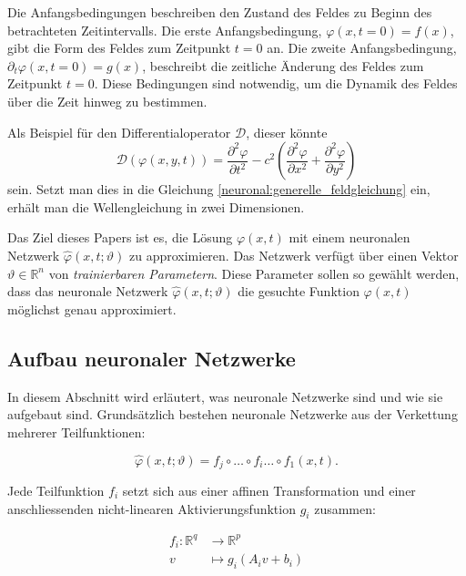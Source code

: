 Die Anfangsbedingungen beschreiben den Zustand des Feldes zu Beginn des betrachteten Zeitintervalls.
Die erste Anfangsbedingung, $\varphi(x, t = 0) = f(x)$, gibt die Form des Feldes zum Zeitpunkt $t = 0$ an.
Die zweite Anfangsbedingung, $\partial_t \varphi(x, t = 0) = g(x)$, beschreibt die zeitliche Änderung des Feldes zum Zeitpunkt $t = 0$.
Diese Bedingungen sind notwendig, um die Dynamik des Feldes über die Zeit hinweg zu bestimmen.

Als Beispiel für den Differentialoperator $\mathcal{D}$, dieser könnte
\begin{equation}
    \mathcal{D}(\varphi(x, y, t)) = \frac{\partial^2 \varphi}{\partial t^2} - c^2 \left( \frac{\partial^2 \varphi}{\partial x^2} + \frac{\partial^2 \varphi}{\partial y^2} \right)
    \label{neuronal:bsp_differentialoperator}
\end{equation}
sein.
Setzt man dies in die Gleichung \eqref{neuronal:generelle_feldgleichung} ein, erhält man die Wellengleichung in zwei Dimensionen.

Das Ziel dieses Papers ist es, die Lösung $\varphi(x, t)$ mit einem neuronalen Netzwerk $\hat{\varphi}(x, t; \vartheta)$ zu approximieren.
Das Netzwerk verfügt über einen Vektor \( \vartheta \in \mathbb{R}^n \) von \emph{trainierbaren Parametern}.
Diese Parameter sollen so gewählt werden, dass das neuronale Netzwerk $\hat{\varphi}(x, t; \vartheta)$ die gesuchte Funktion $\varphi(x, t)$ möglichst genau approximiert.

\subsection{Aufbau neuronaler Netzwerke}\label{neuronal:subsection:struktur_nn}
In diesem Abschnitt wird erläutert, was neuronale Netzwerke sind und wie sie aufgebaut sind.
Grundsätzlich bestehen neuronale Netzwerke aus der Verkettung mehrerer Teilfunktionen:

\begin{equation}
    \hat{\varphi}(x, t; \vartheta) = f_j \circ \ldots \circ f_i \ldots \circ f_1(x, t).
    \label{neuronal:nn_ausformuliert}
\end{equation}

Jede Teilfunktion \( f_i \) setzt sich aus einer affinen Transformation und einer anschliessenden nicht-linearen Aktivierungsfunktion \( g_i \) zusammen:

\begin{align*}
    f_i\colon \mathbb{R}^q & \longrightarrow \mathbb{R}^p \\
    v & \longmapsto g_i(A_i v + b_i)
\end{align*}

